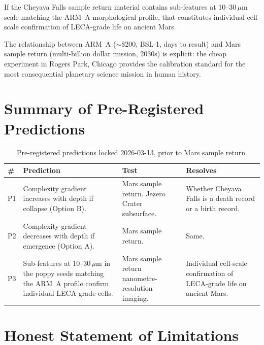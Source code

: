 \documentclass[11pt, a4paper]{article}
\begin{document}
If the Cheyava Falls sample return material
contains sub-features at 10--30\,$\mu$m scale
matching the ARM~A morphological profile, that
constitutes individual cell-scale confirmation
of LECA-grade life on ancient Mars.

The relationship between ARM~A ($\sim$\$200,
BSL-1, days to result) and Mars sample return
(multi-billion dollar mission, 2030s) is explicit:
the cheap experiment in Rogers Park, Chicago
provides the calibration standard for the most
consequential planetary science mission in
human history.

\section{Summary of Pre-Registered Predictions}

\begin{table}[h]
\centering
\small
\begin{tabularx}{\linewidth}{p{0.5cm}p{4.5cm}p{2.0cm}X}
\toprule
\textbf{\#} & \textbf{Prediction} &
\textbf{Test} & \textbf{Resolves} \\
\midrule
P1 &
Complexity gradient increases with depth
if collapse (Option B). &
Mars sample return.
Jezero Crater subsurface. &
Whether Cheyava Falls is a death
record or a birth record. \\[0.3em]
P2 &
Complexity gradient decreases with depth
if emergence (Option A). &
Mars sample return. &
Same. \\[0.3em]
P3 &
Sub-features at 10--30\,$\mu$m in the
poppy seeds matching the ARM~A profile
confirm individual LECA-grade cells. &
Mars sample return
nanometre-resolution
imaging. &
Individual cell-scale
confirmation of LECA-grade
life on ancient Mars. \\
\bottomrule
\end{tabularx}
\caption{Pre-registered predictions locked 2026-03-13,
  prior to Mars sample return.}
\end{table}

\section{Honest Statement of Limitations}
\end{document}
